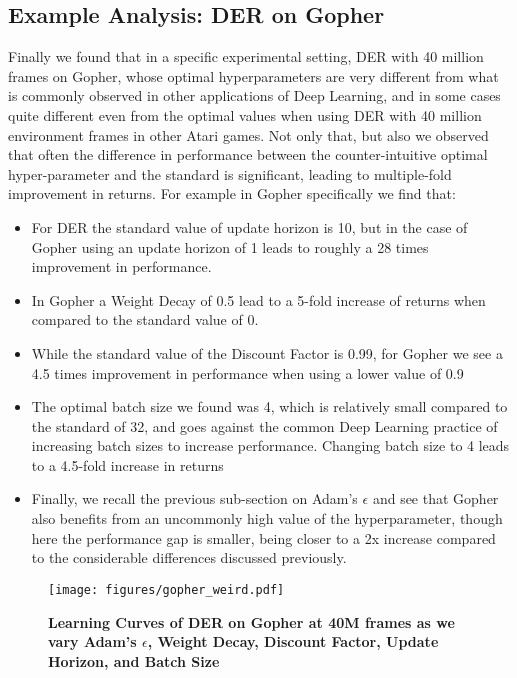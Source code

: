 \subsection{Example Analysis: DER on Gopher}
\label{sec:gopher}
Finally we found that in a specific experimental setting, DER with 40 million frames on Gopher, whose optimal hyperparameters are very different from what is commonly observed in other applications of Deep Learning, and in some cases quite different even from the optimal values when using DER with 40 million environment frames in other Atari games. Not only that, but also we observed that often the difference in performance between the counter-intuitive optimal hyper-parameter and the standard is significant, leading to multiple-fold improvement in returns.
For example in Gopher specifically we find that:
\begin{itemize}
    \item For DER the standard value of update horizon is 10, but in the case of Gopher using an update horizon of 1 leads to roughly a 28 times improvement in performance.
    \item In Gopher a Weight Decay of 0.5 lead to a 5-fold increase of returns when compared to the standard value of 0.
    \item While the standard value of the Discount Factor is 0.99, for Gopher we see a 4.5 times improvement in performance when using a lower value of 0.9
    \item The optimal batch size we found was 4, which is relatively small compared to the standard of 32, and goes against the common Deep Learning practice of increasing batch sizes to increase performance. Changing batch size to 4 leads to a 4.5-fold increase in returns
    \item Finally, we recall the previous sub-section on Adam's $\epsilon$ and see that Gopher also benefits from an uncommonly high value of the hyperparameter, though here the performance gap is smaller, being closer to a 2x increase compared to the considerable differences discussed previously.
\end{itemize}

\begin{figure}[!ht]
    \centering
  \texttt{[image: figures/gopher\_weird.pdf]}%
    \caption{
     \textbf{Learning Curves of DER on Gopher at 40M frames as we vary Adam's $\epsilon$, Weight Decay, Discount Factor, Update Horizon, and Batch Size}
    }
    \label{fig:weird_gopher}
\end{figure}
